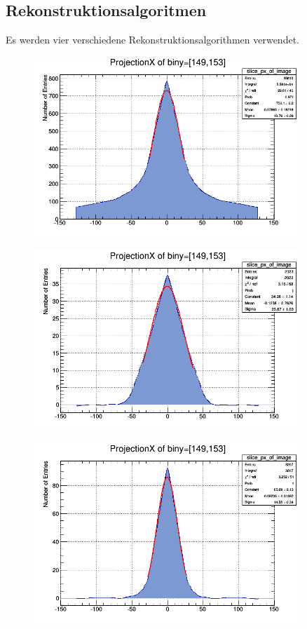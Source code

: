 \subsection{Rekonstruktionsalgoritmen}
Es werden vier verschiedene Rekonstruktionsalgorithmen verwendet.
\begin{figure}[h!]
	\centering
	\includegraphics[width=0.9\textwidth]{Ohne-Filter.png}
	\caption{}
	\label{}
\end{figure}
\begin{figure}[h!]
	\centering
	\includegraphics[width=0.9\textwidth]{Hann-Filter.png}
	\caption{}
	\label{}
\end{figure}
\begin{figure}[h!]
	\centering
	\includegraphics[width=0.9\textwidth]{Shepp-Logan-Filter.png}
	\caption{}
	\label{}
\end{figure}

